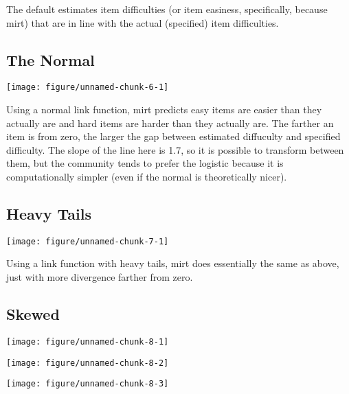 \documentclass{article}\usepackage[]{graphicx}\usepackage[]{color}
\makeatletter
\def\maxwidth{ %
  \ifdim\Gin@nat@width>\linewidth
    \linewidth
  \else
    \Gin@nat@width
  \fi
}
\newenvironment{kframe}{%
 \def\at@end@of@kframe{}%
 \ifinner\ifhmode%
  \def\at@end@of@kframe{\end{minipage}}%
  \begin{minipage}{\columnwidth}%
 \fi\fi%
 \def\FrameCommand##1{\hskip\@totalleftmargin \hskip-\fboxsep
 \colorbox{shadecolor}{##1}\hskip-\fboxsep
     \hskip-\linewidth \hskip-\@totalleftmargin \hskip\columnwidth}%
 \MakeFramed {\advance\hsize-\width
   \@totalleftmargin\z@ \linewidth\hsize
   \@setminipage}}%
 {\par\unskip\endMakeFramed%
 \at@end@of@kframe}
\newenvironment{knitrout}{}{} %
\makeatother
\begin{document}
The default estimates item difficulties (or item easiness, specifically, because mirt) that are in line with the actual (specified) item difficulties.

\subsection{The Normal}

\begin{knitrout}
\color{fgcolor}
\texttt{[image: figure/unnamed-chunk-6-1]} 

\end{knitrout}

Using a normal link function, mirt predicts easy items are easier than they actually are and hard items are harder than they actually are.  The farther an item is from zero, the larger the gap between estimated diffuculty and specified difficulty.  The slope of the line here is 1.7, so it is possible to transform between them, but the community tends to prefer the logistic because it is computationally simpler (even if the normal is theoretically nicer).

\subsection{Heavy Tails}

\begin{knitrout}
\color{fgcolor}
\texttt{[image: figure/unnamed-chunk-7-1]} 

\end{knitrout}

Using a link function with heavy tails, mirt does essentially the same as above, just with more divergence farther from zero.

\subsection{Skewed}

\begin{knitrout}
\color{fgcolor}\begin{kframe}


{\ttfamily\noindent\itshape\color{messagecolor}{\#\# \\\#\# Attaching package: 'sn'}}

{\ttfamily\noindent\itshape\color{messagecolor}{\#\# The following object is masked from 'package:stats':\\\#\# \\\#\#\ \ \ \  sd}}\end{kframe}
\texttt{[image: figure/unnamed-chunk-8-1]} 

\texttt{[image: figure/unnamed-chunk-8-2]} 

\texttt{[image: figure/unnamed-chunk-8-3]} 

\end{knitrout}
\end{document}
